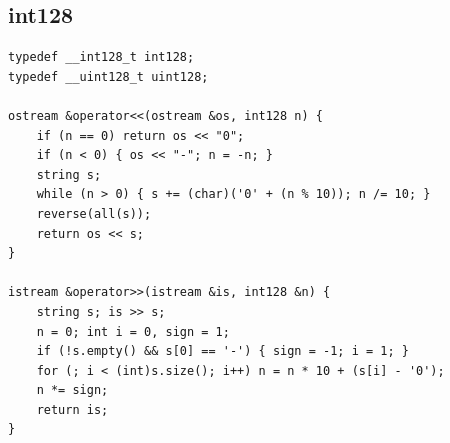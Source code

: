 \documentclass[9pt,a4paper,twocolumn]{extarticle}
\begin{document}
\subsection{int128}
\nopagebreak
\begin{lstlisting}
typedef __int128_t int128;
typedef __uint128_t uint128;

ostream &operator<<(ostream &os, int128 n) {
    if (n == 0) return os << "0";
    if (n < 0) { os << "-"; n = -n; }
    string s;
    while (n > 0) { s += (char)('0' + (n % 10)); n /= 10; }
    reverse(all(s));
    return os << s;
}

istream &operator>>(istream &is, int128 &n) {
    string s; is >> s;
    n = 0; int i = 0, sign = 1;
    if (!s.empty() && s[0] == '-') { sign = -1; i = 1; }
    for (; i < (int)s.size(); i++) n = n * 10 + (s[i] - '0');
    n *= sign;
    return is;
}
\end{lstlisting}

\filbreak
\end{document}
